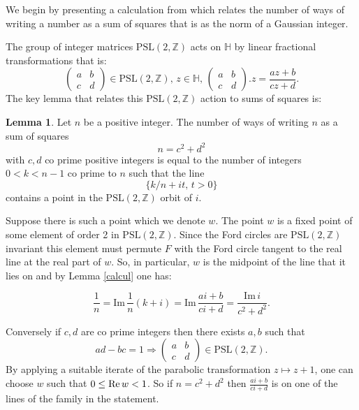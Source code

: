 \documentclass[12pt]{amsart}
\theoremstyle{plain}
\theoremstyle{definition}
\newtheorem{lem}[thm]{Lemma}
\def\HH{\mathbb{H}}
\def\im{\mathrm{Im}\,}
\def\ZZ{\mathbb{Z}}
\def\sl2{\mathrm{PSL}(2, \ZZ)}
\begin{document}
We begin by presenting a calculation from \cite{vlad}
which relates the number of ways of writing a number as a sum of
squares that is as the norm of a Gaussian integer.

The group of integer matrices $\sl2$  acts on $\HH$ by linear fractional transformations
that is:
$$\begin{pmatrix}
a & b \\
c & d
\end{pmatrix} \in \sl2,\, z\in \HH,\, 
\begin{pmatrix}
a & b \\
c & d
\end{pmatrix}. z = \frac{az + b}{cz + d}.
$$
The key lemma that relates this  $\sl2$ action to sums of squares is:

\begin{lem} \label{squares}
Let $n$ be a positive integer.
The number of  ways of writing $n$  as a  sum of squares
$$n = c^2 + d^2$$
with $c,d$ co prime positive  integers
is equal to the number of  integers $0 < k < n-1$ co prime to $n$
such that the line
$$\{  k/n + i t,\, t >0 \}$$
contains  a point in the $\sl2$  orbit of $i$.
\end{lem}


\proof  Suppose there is such  a point which we denote  $w$.
The point $w$ is a fixed point of some  element of order 2 in $\sl2$.
Since the Ford circles are $\sl2$ invariant
this element must permute $F$ with the Ford circle tangent 
to the real line  at the real part of $w$.
So, in particular, $w$ is the midpoint of the line 
that it lies on 
and by  Lemma \ref{calcul} one has:


\begin{equation}
\label{gaussian integers}
\frac{1}{n} = \im \frac{1 }{n}(k + i)  
= \im  \frac{ai +b}{ci+d }
= \frac{\im i} {c^2 + d^2}.
\end{equation}

Conversely if $c,d$ are co prime integers 
 then there exists $a,b$ such that
 $$ad - bc = 1 \Rightarrow  
 \begin{pmatrix}
 a & b \\
 c & d
 \end{pmatrix} \in \sl2.
$$
By applying a suitable iterate of the parabolic transformation 
$z \mapsto z + 1$,
one can choose $w$ such that $0 \leq \text{Re\,} w < 1$.
So if $n = c^2 + d^2$ then $\frac{ai +b}{ci+d }$
is on one of the lines of the family in the statement.
\end{document}
